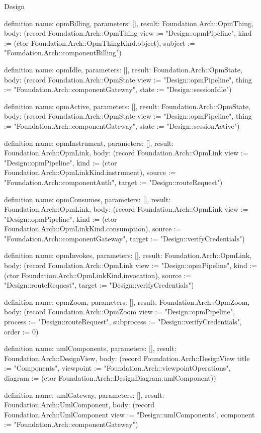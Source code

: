 \begin{lexlean}{Design}
\begin{semanticmodule}
definition{
  name: opmBilling,
  parameters: [],
  result: Foundation.Arch::OpmThing,
  body: (record Foundation.Arch::OpmThing {view := "Design::opmPipeline", kind := (ctor Foundation.Arch::OpmThingKind.object), subject := "Foundation.Arch::componentBilling"})
}

definition{
  name: opmIdle,
  parameters: [],
  result: Foundation.Arch::OpmState,
  body: (record Foundation.Arch::OpmState {view := "Design::opmPipeline", thing := "Foundation.Arch::componentGateway", state := "Design::sessionIdle"})
}

definition{
  name: opmActive,
  parameters: [],
  result: Foundation.Arch::OpmState,
  body: (record Foundation.Arch::OpmState {view := "Design::opmPipeline", thing := "Foundation.Arch::componentGateway", state := "Design::sessionActive"})
}

definition{
  name: opmInstrument,
  parameters: [],
  result: Foundation.Arch::OpmLink,
  body: (record Foundation.Arch::OpmLink {view := "Design::opmPipeline", kind := (ctor Foundation.Arch::OpmLinkKind.instrument), source := "Foundation.Arch::componentAuth", target := "Design::routeRequest"})
}

definition{
  name: opmConsumes,
  parameters: [],
  result: Foundation.Arch::OpmLink,
  body: (record Foundation.Arch::OpmLink {view := "Design::opmPipeline", kind := (ctor Foundation.Arch::OpmLinkKind.consumption), source := "Foundation.Arch::componentGateway", target := "Design::verifyCredentials"})
}

definition{
  name: opmInvokes,
  parameters: [],
  result: Foundation.Arch::OpmLink,
  body: (record Foundation.Arch::OpmLink {view := "Design::opmPipeline", kind := (ctor Foundation.Arch::OpmLinkKind.invocation), source := "Design::routeRequest", target := "Design::verifyCredentials"})
}

definition{
  name: opmZoom,
  parameters: [],
  result: Foundation.Arch::OpmZoom,
  body: (record Foundation.Arch::OpmZoom {view := "Design::opmPipeline", process := "Design::routeRequest", subprocess := "Design::verifyCredentials", order := 0})
}

definition{
  name: umlComponents,
  parameters: [],
  result: Foundation.Arch::DesignView,
  body: (record Foundation.Arch::DesignView {title := "Components", viewpoint := "Foundation.Arch::viewpointOperations", diagram := (ctor Foundation.Arch::DesignDiagram.umlComponent)})
}

definition{
  name: umlGateway,
  parameters: [],
  result: Foundation.Arch::UmlComponent,
  body: (record Foundation.Arch::UmlComponent {view := "Design::umlComponents", component := "Foundation.Arch::componentGateway"})
}


\end{semanticmodule}
\end{lexlean}
